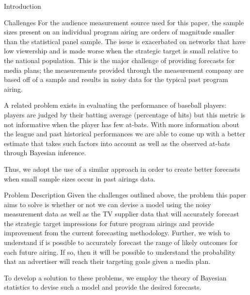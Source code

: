 \begin{chapter}{Introduction}
\begin{section}{Challenges}
  For the audience measurement source used for this paper, the sample sizes
  present on an individual program airing are orders of magnitude smaller than the statistical panel sample.
  The issue is exacerbated on networks that have low viewership and is made worse when
  the strategic target is small relative to the national population.
  This is the major challenge of providing forecasts for media plans;
  the measurements provided through the measurement company are based off of a sample
  and results in noisy data for the typical past program airing.

  A related problem exists in evaluating the performance of baseball players:
  players are judged by their batting average (percentage of hits) but this metric is not informative when
  the player has few at-bats. With more information about the league and past historical performances we are able to
  come up with a better estimate that takes such factors into account
  as well as the observed at-bats through Bayesian inference.

  Thus, we adopt the use of a similar approach in order to create better forecasts when
  small sample sizes occur in past airings data.
\end{section}

\begin{section}{Problem Description}
  Given the challenges outlined above, the problem this paper aims to solve is whether or not
  we can devise a model using
  the noisy measurement data as well as the TV supplier data that will accurately
  forecast the strategic target impressions for future program airings
  and provide improvement from the current forecasting methodology.
  Further, we wish to understand if is possible to accurately forecast the range of likely
  outcomes for each future airing. If so, then it will be possible to understand the
  probability that an advertiser will reach their targeting goals given a media plan.

  To develop a solution to these problems, we employ the theory of Bayesian statistics to devise such a model
  and provide the desired forecasts.
\end{section}
\end{chapter}